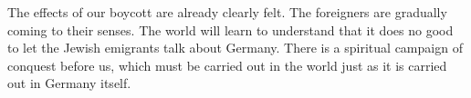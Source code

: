 The effects of our boycott are already clearly felt. The foreigners are gradually coming to their senses. The world will learn to understand that it does no good to let the Jewish emigrants talk about Germany. There is a spiritual campaign of conquest before us, which must be carried out in the world just as it is carried out in Germany itself.
